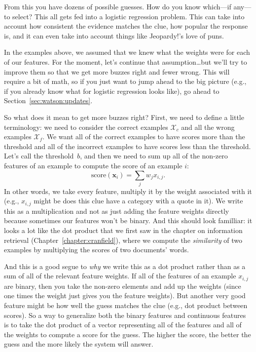 From this you have dozens of possible guesses.  How do you know which---if
any—to select?  This all gets fed into a logistic regression problem.  This
can take into account how consistent the evidence matches the clue, how
popular the response is, and it can even take into account things like
Jeopardy!’s love of puns.

In the examples above, we assumed that we knew what the weights were for each
of our features.
%
For the moment, let's continue that assumption\dots but we'll try to improve
them so that we get more buzzes right and fewer wrong.
%
This will require a bit of math, so if you just want to jump ahead to the big
picture (e.g., if you already know what  for logistic regression
looks like), go ahead to Section~\ref{sec:watson:updates}.

So what does it mean to get more buzzes right?  First, we need to define a
little terminology: we need to consider the correct examples $\mathcal{X}_c$
and all the wrong examples $\mathcal{X}_f$.
%
We want all of the correct examples to have scores more than the threshold and
all of the incorrect examples to have scores less than the threshold.
%
Let's call the threshold~$b$, and then we need to sum up all of the non-zero
features of an example to compute the score of an example $i$:
\begin{equation}
  \mbox{score}({\bm x}_i) = \sum_{j} w_j x_{i,j}.
  \label{eq:lr-dot}
\end{equation}
In other words, we take every feature, multiply it by the weight associated
with it (e.g., $x_{i,j}$ might be does this clue have a category with a quote
in it).
%
We write this as a multiplication and not as just adding the feature weights
directly because sometimes our features won't be binary.
%
And this should look familliar: it looks a lot like the dot product that we
first saw in the chapter on information retrieval
(Chapter~\ref{chapter:cranfield}), where we compute the \emph{similarity} of
two examples by multiplying the \tfidf{} scores of two documents' words.

And this is a good segue to \emph{why} we write this as a dot product rather
than as a sum of all of the relevant feature weights.
%
If all of the features of an example $x_{i,j}$ are binary, then you take the
non-zero elements and add up the weights (since one times the weight just
gives you the feature weights).
%
But another very good feature might be how well the guess matches the clue
(e.g., dot product between \tfidf{} scores).
%
So a way to generalize both the binary features and continuous features is to
take the dot product of a vector representing all of the features and all of
the weights to compute a score for the guess.
%
The higher the score, the better the guess and the more likely the system will
answer.

